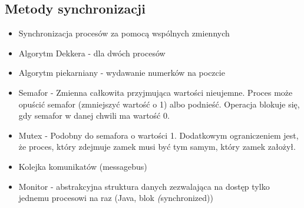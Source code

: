 \subsection{Metody synchronizacji}
\begin{itemize}[itemsep=0pt,partopsep=0pt, parsep=0pt]

    \item Synchronizacja procesów za pomocą wspólnych zmiennych

    \item Algorytm Dekkera - dla dwóch procesów

    \item Algorytm piekarniany - wydawanie numerków na poczcie

    \item Semafor - Zmienna całkowita przyjmująca wartości nieujemne.
    Proces może opuścić semafor (zmniejszyć wartość o 1) albo podnieść.
    Operacja blokuje się, gdy semafor w danej chwili ma wartość 0.

    \item Mutex - Podobny do semafora o wartości 1.
    Dodatkowym ograniczeniem jest, że proces, który zdejmuje zamek musi być tym samym, który zamek założył.

    \item Kolejka komunikatów (messagebus)

    \item Monitor - abstrakcyjna struktura danych
    zezwalająca na dostęp tylko jednemu procesowi na raz (Java, blok \textit(synchronized))
\end{itemize}
